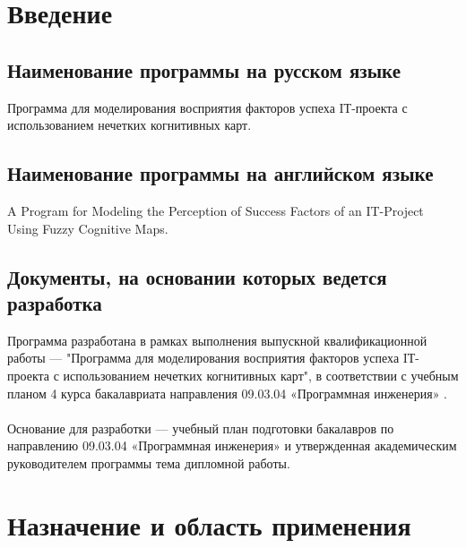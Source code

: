 \documentclass{article}
\begin{document}
    \section {Введение}
    \subsection {Наименование программы на русском языке}
    Программа для моделирования восприятия факторов успеха IТ-проекта с использованием нечетких когнитивных карт.
    \subsection {Наименование программы на английском языке}
    A Program for Modeling the Perception of Success Factors of an IT-Project Using Fuzzy Cognitive Maps.
    \subsection {Документы, на основании которых ведется разработка}
    Программа разработана в рамках выполнения выпускной квалификационной работы — "{}Программа для моделирования восприятия факторов успеха IТ-проекта с использованием нечетких когнитивных карт"{}, в соответствии с учебным планом 4 курса бакалавриата направления 09.03.04 «Программная инженерия» \cite{litlink10}.\\
    ~\\
    Основание для разработки — учебный план подготовки бакалавров по направлению 09.03.04 «Программная инженерия» \cite{litlink11} и утвержденная академическим руководителем программы тема дипломной работы.
    \newpage
    \section {Назначение и область применения}
\end{document}

